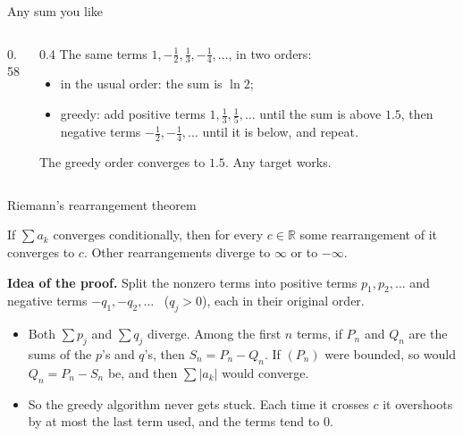 \documentclass{wosm-slides}
\newcommand{\R}{\mathbb{R}}
\begin{document}
\begin{frame}{Any sum you like}
\begin{columns}[c]
\begin{column}{0.58\textwidth}
    \end{column}
    \begin{column}{0.4\textwidth}
      \small
      The same terms $1, -\frac12, \frac13, -\frac14, \dots$, in two orders:
      \begin{itemize}
        \item {\color{wosm-accent}in the usual order}: the sum is $\ln 2$;
        \item {\color{wosm-brick}greedy}: add positive terms $1, \frac13, \frac15, \dots$
          until the sum is above $1.5$, then negative terms $-\frac12, -\frac14, \dots$
          until it is below, and repeat.
      \end{itemize}
      The greedy order converges to $1.5$. Any target works.
    \end{column}
  \end{columns}
\end{frame}

\begin{frame}{Riemann's rearrangement theorem}
  \begin{theorem}[Riemann]
    If $\sum a_k$ converges conditionally, then for every $c \in \R$ some rearrangement
    of it converges to $c$. Other rearrangements diverge to $\infty$ or to $-\infty$.
  \end{theorem}
  \pause
  \textbf{Idea of the proof.} Split the nonzero terms into positive terms $p_1, p_2, \dots$ and
  negative terms $-q_1, -q_2, \dots$ \ ($q_j > 0$), each in their original order.
  \begin{itemize}
    \item Both $\sum p_j$ and $\sum q_j$ diverge. Among the first $n$ terms, if $P_n$ and
      $Q_n$ are the sums of the $p$'s and $q$'s, then $S_n = P_n - Q_n$. If $(P_n)$ were
      bounded, so would $Q_n = P_n - S_n$ be, and then $\sum |a_k|$ would converge.
    \item So the greedy algorithm never gets stuck. Each time it crosses $c$ it overshoots by
      at most the last term used, and the terms tend to $0$.
  \end{itemize}
\end{frame}
\end{document}
